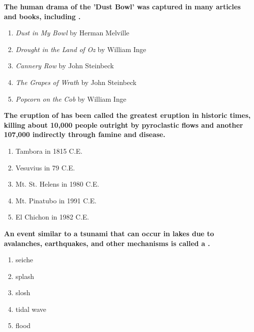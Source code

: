 \item {
\setlength{\itemsep}{0cm}
\setlength{\parskip}{.2cm}
\begin{samepage}
\textbf{
The human drama of the 'Dust Bowl' was captured in many articles and books, including \makebox[1cm]{\Rivpt\hrulefill\Rivpt}.
}
\begin{enumerate}
\item {  \emph{Dust in My Bowl} by Herman Melville  }
\item {  \emph{Drought in the Land of Oz} by William Inge }
\item {  \emph{Cannery Row} by John Steinbeck  }
\item {  \emph{The Grapes of Wrath} by John Steinbeck  }
\item {  \emph{Popcorn on the Cob} by William Inge }
\end{enumerate}
\end{samepage}
}
\item {
\setlength{\itemsep}{0cm}
\setlength{\parskip}{.2cm}
\begin{samepage}
\textbf{
The eruption of \makebox[1cm]{\Rivpt\hrulefill\Rivpt} has been called the greatest eruption in historic times, killing about 10,000 people outright by pyroclastic flows and another 107,000 indirectly through famine and disease. 
}
\begin{enumerate}
\item {  Tambora in 1815 C.E. }
\item {  Vesuvius in 79 C.E. }
\item {  Mt. St. Helens in 1980 C.E. }
\item {  Mt. Pinatubo in 1991 C.E. }
\item {  El Chichon in 1982 C.E. }
\end{enumerate}
\end{samepage}
}
\item {
\setlength{\itemsep}{0cm}
\setlength{\parskip}{.2cm}
\begin{samepage}
\textbf{
An event similar to a tsunami that can occur in lakes due to avalanches, earthquakes, and other mechanisms is called a \makebox[1cm]{\Rivpt\hrulefill\Rivpt}.
}
\begin{enumerate}
\item { 	seiche }
\item { 	splash }
\item { 	slosh }
\item { 	tidal wave }
\item { 	flood }
\end{enumerate}
\end{samepage}
}
